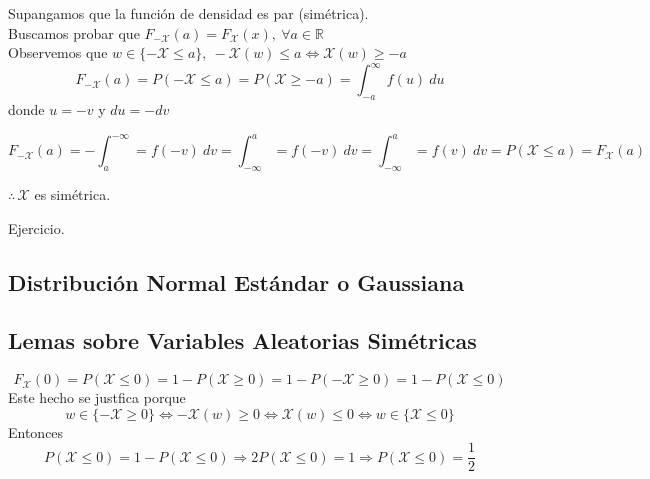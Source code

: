 
\begin{myproof}
  \boxed{\Leftarrow} Supangamos que la función de densidad es par (simétrica). \\Buscamos probar que $F_{\mathcal {-X}}(a) = F_{\mathcal X}(x),~ \forall a \in \mathbb R$\\
  Observemos que $w \in \{-\mathcal X \le a\},~ -\mathcal X (w)\le a \Leftrightarrow \mathcal X(w) \ge -a$
  \[F_{-\mathcal X}(a) = P(-\mathcal X \le a) = P(\mathcal X \ge -a) = \int_{-a}^{\infty} f(u)~du\] donde $u = -v$ y $du = -dv$

  \[F_{-\mathcal X}(a) = - \int_{a}^{-\infty} = f(-v)~dv = \int_{-\infty}^a = f(-v)~dv = \int_{-\infty}^a = f(v)~dv = P(\mathcal X \le a) = F_{\mathcal X}(a)\]
  \begin{center}
    $\therefore \, \mathcal X$ es simétrica.
  \end{center}
  \boxed{\Rightarrow} Ejercicio.

\end{myproof}

\subsection{Distribución Normal Estándar o Gaussiana}




\subsection{Lemas sobre Variables Aleatorias Simétricas}

\begin{myproof}
  \[F_{\mathcal X}(0) = P(\mathcal X \le 0) = 1 - P(\mathcal X \ge 0) = 1 - P(-\mathcal X \ge 0) = 1 - P(\mathcal X \le 0)\]
  Este hecho se justfica porque
  \[w \in \{-\mathcal X  \ge 0\} \Leftrightarrow -\mathcal X(w) \ge 0 \Leftrightarrow \mathcal X(w) \le 0 \Leftrightarrow w \in \{\mathcal X \le 0\}\]
  Entonces
  \[P(\mathcal X \le 0) = 1 - P(\mathcal X \le 0) \Rightarrow 2P(\mathcal X \le 0)= 1 \Rightarrow P(\mathcal X \le 0) = \frac12\]
\end{myproof}

